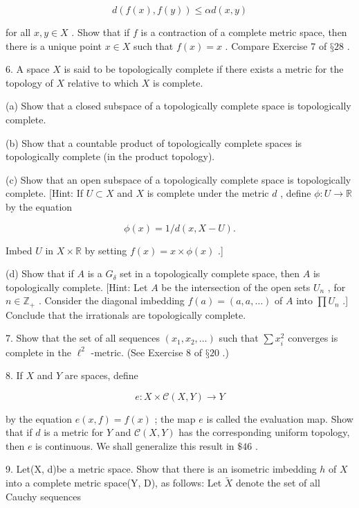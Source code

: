 \[
d\left( {f\left( x\right) ,f\left( y\right) }\right)  \leq  {\alpha d}\left( {x,y}\right)
\]

for all \(x,y \in  X\) . Show that if \(f\) is a contraction of a complete metric space, then there is a unique point \(x \in  X\) such that \(f\left( x\right)  = x\) . Compare Exercise 7 of \(§{28}\) .

6. A space \(X\) is said to be topologically complete if there exists a metric for the topology of \(X\) relative to which \(X\) is complete.

(a) Show that a closed subspace of a topologically complete space is topologically complete.

(b) Show that a countable product of topologically complete spaces is topologically complete (in the product topology).

(c) Show that an open subspace of a topologically complete space is topologically complete. [Hint: If \(U \subset  X\) and \(X\) is complete under the metric \(d\) , define \(\phi  : U \rightarrow  \mathbb{R}\) by the equation

\[
\phi \left( x\right)  = 1/d\left( {x,X - U}\right) .
\]

Imbed \(U\) in \(X \times  \mathbb{R}\) by setting \(f\left( x\right)  = x \times  \phi \left( x\right)\) .]

(d) Show that if \(A\) is a \({G}_{\delta }\) set in a topologically complete space, then \(A\) is topologically complete. [Hint: Let \(A\) be the intersection of the open sets \({U}_{n}\) , for \(n \in  {\mathbb{Z}}_{ + }\) . Consider the diagonal imbedding \(f\left( a\right)  = \left( {a,a,\ldots }\right)\) of \(A\) into \(\prod {U}_{n}\) .] Conclude that the irrationals are topologically complete.

7. Show that the set of all sequences \(\left( {{x}_{1},{x}_{2},\ldots }\right)\) such that \(\sum {x}_{i}^{2}\) converges is complete in the \({\ell }^{2}\) -metric. (See Exercise 8 of \(§{20}\) .)

8. If \(X\) and \(Y\) are spaces, define

\[
e : X \times  \mathcal{C}\left( {X,Y}\right)  \rightarrow  Y
\]

by the equation \(e\left( {x,f}\right)  = f\left( x\right)\) ; the map \(e\) is called the evaluation map. Show that if \(d\) is a metric for \(Y\) and \(\mathcal{C}\left( {X,Y}\right)\) has the corresponding uniform topology, then \(e\) is continuous. We shall generalize this result in \(\$ {46}\) .

9. Let(X, d)be a metric space. Show that there is an isometric imbedding \(h\) of \(X\) into a complete metric space(Y, D), as follows: Let \(\widetilde{X}\) denote the set of all Cauchy sequences

